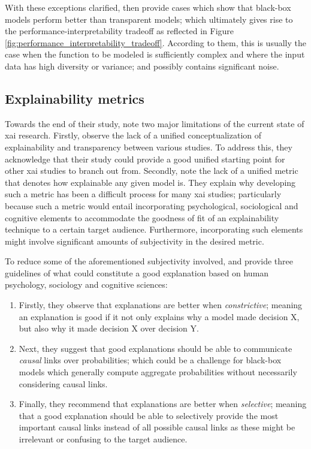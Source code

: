 With these exceptions clarified, \citet{arrieta2020explainable} then provide cases
which show that black-box models perform better than transparent models; which
ultimately gives rise to the performance-interpretability tradeoff as
reflected in Figure \ref{fig:performance_interpretability_tradeoff}. According to
them, this is usually the case when the function to be modeled is sufficiently
complex and where the input data has high diversity or variance; and possibly
contains significant noise.

\subsection{Explainability metrics}

\label{section:xai_metrics}

Towards the end of their study, \citet{arrieta2020explainable} note two major
limitations of the current state of \ac{xai} research. Firstly, \citet[Page 19,
Section 5.2]{arrieta2020explainable} observe the lack of a unified
conceptualization of explainability and transparency between various studies. To
address this, they acknowledge that their study could provide a good unified
starting point for other \ac{xai} studies to branch out from. Secondly,
\citet[Page 20, Section 5.3]{arrieta2020explainable} note the lack of a unified
metric that denotes how explainable any given model is. They explain why
developing such a metric has been a difficult process for many \ac{xai} studies;
particularly because such a metric would entail incorporating psychological,
sociological and cognitive elements to accommodate the goodness of fit of an
explainability technique to a certain target audience. Furthermore,
incorporating such elements might involve significant amounts of subjectivity in
the desired metric.

To reduce some of the aforementioned subjectivity involved, \citet[Page 3,
Section 1.2]{MILLER20191} and \citet[Page 20, Section
5.3]{arrieta2020explainable} provide three guidelines of what could constitute a
good explanation based on human psychology, sociology and cognitive sciences:

\begin{enumerate}
  \item Firstly, they observe that explanations are better when
  \textit{constrictive}; meaning an explanation is good if it not only explains
  why a model made decision X, but also why it made decision X over decision Y.

  \item Next, they suggest that good explanations should be able to communicate
  \textit{causal} links over probabilities; which could be a challenge for black-box
  models which generally compute aggregate probabilities without necessarily
  considering causal links.

  \item Finally, they recommend that explanations are better when
  \textit{selective}; meaning that a good explanation should be able to
  selectively provide the most important causal links instead of all possible
  causal links as these might be irrelevant or confusing to the target audience.
\end{enumerate}


